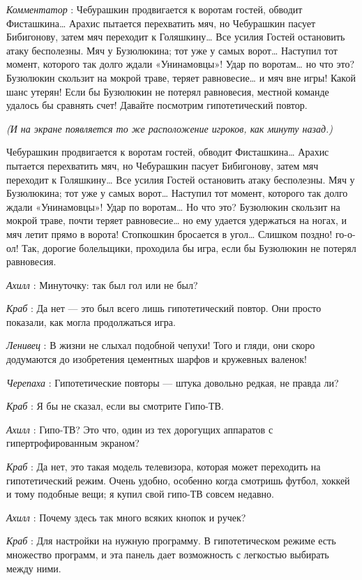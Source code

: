 \emph{Комментатор} : Чебурашкин продвигается к воротам гостей, обводит Фисташкина\ldots{} Арахис пытается перехватить мяч, но Чебурашкин пасует Бибигонову, затем мяч переходит к Голяшкину\ldots{} Все усилия Гостей остановить атаку бесполезны. Мяч у Бузюлюкина; тот уже у самых ворот\ldots{} Наступил тот момент, которого так долго ждали «Унинамовцы»! Удар по воротам\ldots{} но что это? Бузюлюкин скользит на мокрой траве, теряет равновесие\ldots{} и мяч вне игры! Какой шанс утерян! Если бы Бузюлюкин не потерял равновесия, местной команде удалось бы сравнять счет! Давайте посмотрим гипотетический повтор.

\emph{(И на экране появляется то же расположение игроков, как минуту назад.)}

Чебурашкин продвигается к воротам гостей, обводит Фисташкина\ldots{} Арахис пытается перехватить мяч, но Чебурашкин пасует Бибигонову, затем мяч переходит к Голяшкину\ldots{} Все усилия Гостей остановить атаку бесполезны. Мяч у Бузюлюкина; тот уже у самых ворот\ldots{} Наступил тот момент, которого так долго ждали «Унинамовцы»! Удар по воротам\ldots{} Но что это? Бузюлюкин скользит на мокрой траве, почти теряет равновесие\ldots{} но ему удается удержаться на ногах, и мяч летит прямо в ворота! Стопкошкин бросается в угол\ldots{} Слишком поздно! го-о-ол! Так, дорогие болельщики, проходила бы игра, если бы Бузюлюкин не потерял равновесия.

\emph{Ахилл} : Минуточку: так был гол или не был?

\emph{Краб} : Да нет --- это был всего лишь гипотетический повтор. Они просто показали, как могла продолжаться игра.

\emph{Ленивец} : В жизни не слыхал подобной чепухи! Того и гляди, они скоро додумаются до изобретения цементных шарфов и кружевных валенок!

\emph{Черепаха} : Гипотетические повторы --- штука довольно редкая, не правда ли?

\emph{Краб} : Я бы не сказал, если вы смотрите Гипо-ТВ.

\emph{Ахилл} : Гипо-ТВ? Это что, один из тех дорогущих аппаратов с гипертрофированным экраном?

\emph{Краб} : Да нет, это такая модель телевизора, которая может переходить на гипотетический режим. Очень удобно, особенно когда смотришь футбол, хоккей и тому подобные вещи; я купил свой гипо-ТВ совсем недавно.

\emph{Ахилл} : Почему здесь так много всяких кнопок и ручек?

\emph{Краб} : Для настройки на нужную программу. В гипотетическом режиме есть множество программ, и эта панель дает возможность с легкостью выбирать между ними.

